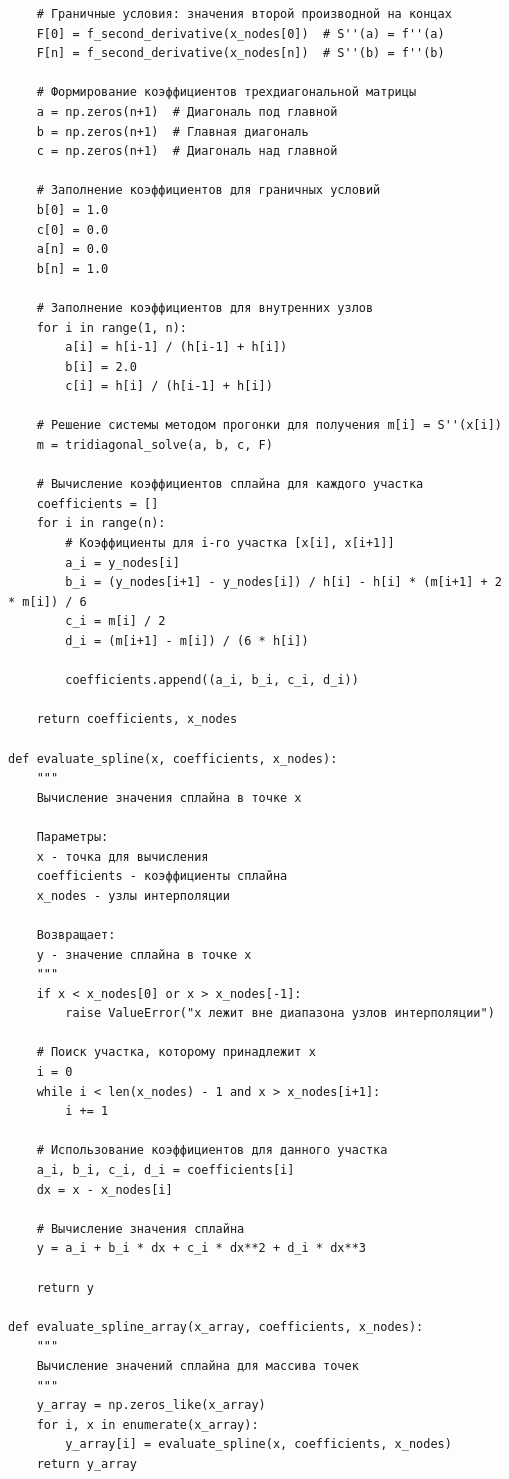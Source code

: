 \documentclass[12pt]{article}
\begin{document}
\begin{verbatim}
    # Граничные условия: значения второй производной на концах
    F[0] = f_second_derivative(x_nodes[0])  # S''(a) = f''(a)
    F[n] = f_second_derivative(x_nodes[n])  # S''(b) = f''(b)
    
    # Формирование коэффициентов трехдиагональной матрицы
    a = np.zeros(n+1)  # Диагональ под главной
    b = np.zeros(n+1)  # Главная диагональ
    c = np.zeros(n+1)  # Диагональ над главной
    
    # Заполнение коэффициентов для граничных условий
    b[0] = 1.0
    c[0] = 0.0
    a[n] = 0.0
    b[n] = 1.0
    
    # Заполнение коэффициентов для внутренних узлов
    for i in range(1, n):
        a[i] = h[i-1] / (h[i-1] + h[i])
        b[i] = 2.0
        c[i] = h[i] / (h[i-1] + h[i])
    
    # Решение системы методом прогонки для получения m[i] = S''(x[i])
    m = tridiagonal_solve(a, b, c, F)
    
    # Вычисление коэффициентов сплайна для каждого участка
    coefficients = []
    for i in range(n):
        # Коэффициенты для i-го участка [x[i], x[i+1]]
        a_i = y_nodes[i]
        b_i = (y_nodes[i+1] - y_nodes[i]) / h[i] - h[i] * (m[i+1] + 2 * m[i]) / 6
        c_i = m[i] / 2
        d_i = (m[i+1] - m[i]) / (6 * h[i])
        
        coefficients.append((a_i, b_i, c_i, d_i))
    
    return coefficients, x_nodes

def evaluate_spline(x, coefficients, x_nodes):
    """
    Вычисление значения сплайна в точке x
    
    Параметры:
    x - точка для вычисления
    coefficients - коэффициенты сплайна
    x_nodes - узлы интерполяции
    
    Возвращает:
    y - значение сплайна в точке x
    """
    if x < x_nodes[0] or x > x_nodes[-1]:
        raise ValueError("x лежит вне диапазона узлов интерполяции")
    
    # Поиск участка, которому принадлежит x
    i = 0
    while i < len(x_nodes) - 1 and x > x_nodes[i+1]:
        i += 1
    
    # Использование коэффициентов для данного участка
    a_i, b_i, c_i, d_i = coefficients[i]
    dx = x - x_nodes[i]
    
    # Вычисление значения сплайна
    y = a_i + b_i * dx + c_i * dx**2 + d_i * dx**3
    
    return y

def evaluate_spline_array(x_array, coefficients, x_nodes):
    """
    Вычисление значений сплайна для массива точек
    """
    y_array = np.zeros_like(x_array)
    for i, x in enumerate(x_array):
        y_array[i] = evaluate_spline(x, coefficients, x_nodes)
    return y_array


\end{verbatim}
\end{document}
